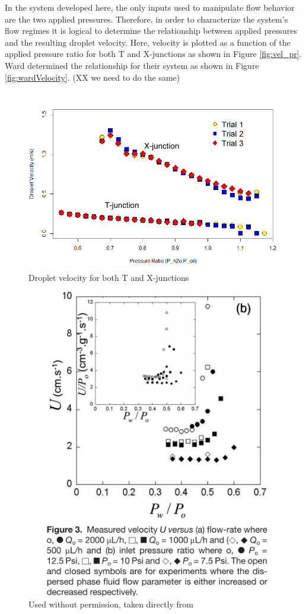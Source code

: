 In the system developed here, the only inputs used to manipulate flow behavior are the two applied pressures. Therefore, in order to characterize the system's flow regimes it is logical to determine the relationship between applied pressures and the resulting droplet velocity. Here, velocity is plotted as a function of the applied pressure ratio for both T and X-junctions as shown in Figure \vref{fig:vel_pr}.  Ward determined the relationship for their system as shown in Figure \vref{fig:wardVelocity}. (XX we need to do the same)

\begin{figure}[h]
\centering 
\includegraphics[width=01.0\columnwidth]{vel_pr.PNG} 
\caption[Droplet Velocity as a function of Applied Control Pressure Ratio]{Droplet velocity for both T and X-junctions }
\label{fig:vel_pr} 
\end{figure}


\begin{figure}[h]
\centering 
\includegraphics[width=0.75\columnwidth]{wardVelocity.PNG} 
\caption[Velocity, U as a function of applied pressure]{Used without permission, taken directly from \cite{Ward2005} }
\label{fig:wardVelocity} 
\end{figure}



